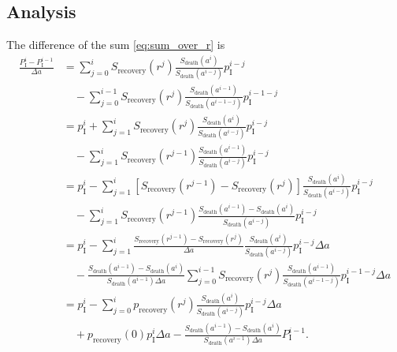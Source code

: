 \documentclass[12pt]{article}
\begin{document}
\subsection{Analysis}

The difference of the sum \eqref{eq:sum_over_r} is
\begin{equation}
  \label{eq:sum_difference}
  \begin{split}
    \frac{P_{\mathrm{I}}^i - P_{\mathrm{I}}^{i - 1}}{\Delta a}
    &=
    \sum_{j = 0}^i S_{\text{recovery}}(r^j)
    \frac{S_{\text{death}}(a^i)}{S_{\text{death}}(a^{i - j})}
    p_{\mathrm{I}}^{i - j}
    \\ & \quad {}
    - \sum_{j = 0}^{i - 1} S_{\text{recovery}}(r^j)
    \frac{S_{\text{death}}(a^{i - 1})}{S_{\text{death}}(a^{i - 1 - j})}
    p_{\mathrm{I}}^{i - 1 - j}
    \\
    &= p_{\mathrm{I}}^i
    + \sum_{j = 1}^i S_{\text{recovery}}(r^j)
    \frac{S_{\text{death}}(a^i)}{S_{\text{death}}(a^{i - j})}
    p_{\mathrm{I}}^{i - j}
    \\ & \quad {}
    - \sum_{j = 1}^i S_{\text{recovery}}(r^{j - 1})
    \frac{S_{\text{death}}(a^{i - 1})}{S_{\text{death}}(a^{i - j})}
    p_{\mathrm{I}}^{i - j}
    \\
    &= p_{\mathrm{I}}^i
    - \sum_{j = 1}^i \left[
      S_{\text{recovery}}(r^{j - 1})
      - S_{\text{recovery}}(r^j)
    \right]
    \frac{S_{\text{death}}(a^i)}{S_{\text{death}}(a^{i - j})}
    p_{\mathrm{I}}^{i - j}
    \\ & \quad {}
    - \sum_{j = 1}^i S_{\text{recovery}}(r^{j - 1})
    \frac{S_{\text{death}}(a^{i - 1}) - S_{\text{death}}(a^i)}
    {S_{\text{death}}(a^{i - j})}
    p_{\mathrm{I}}^{i - j}
    \\
    &= p_{\mathrm{I}}^i
    - \sum_{j = 1}^i
    \frac{S_{\text{recovery}}(r^{j - 1}) - S_{\text{recovery}}(r^j)}
    {\Delta a}
    \frac{S_{\text{death}}(a^i)}{S_{\text{death}}(a^{i - j})}
    p_{\mathrm{I}}^{i - j} \Delta a
    \\ & \quad {}
    -
    \frac{S_{\text{death}}(a^{i - 1}) - S_{\text{death}}(a^i)}
    {S_{\text{death}}(a^{i - 1}) \Delta a}
    \sum_{j = 0}^{i - 1} S_{\text{recovery}}(r^j)
    \frac{S_{\text{death}}(a^{i - 1})}{S_{\text{death}}(a^{i - 1 - j})}
    p_{\mathrm{I}}^{i - 1 - j} \Delta a
    \\
    &= p_{\mathrm{I}}^i
    - \sum_{j = 0}^i p_{\text{recovery}}(r^j)
    \frac{S_{\text{death}}(a^i)}{S_{\text{death}}(a^{i - j})}
    p_{\mathrm{I}}^{i - j} \Delta a
    \\ & \quad {}
    + p_{\text{recovery}}(0) p_{\mathrm{I}}^i \Delta a
    - \frac{S_{\text{death}}(a^{i - 1}) - S_{\text{death}}(a^i)}
    {S_{\text{death}}(a^{i - 1}) \Delta a}
    P_{\mathrm{I}}^{i - 1}.
  \end{split}
\end{equation}
\end{document}
